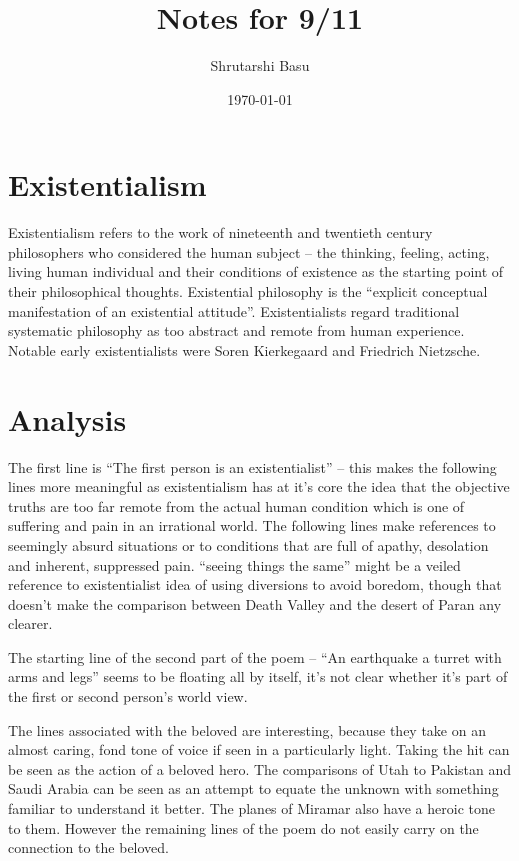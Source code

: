 \documentclass[11pt,letterpaper]{article}
\title{Notes for 9/11}
\author{Shrutarshi Basu}
\date{\today}
\begin{document}
\maketitle
\doublespacing


\section*{Existentialism}
Existentialism refers to the work of nineteenth and twentieth century philosophers who considered the human subject -- the thinking, feeling, acting, living human individual and their conditions of existence as the starting point of their philosophical thoughts. Existential philosophy is the ``explicit conceptual manifestation of an existential attitude''. Existentialists regard traditional systematic philosophy as too abstract and remote from human experience. Notable early existentialists were Soren Kierkegaard and Friedrich Nietzsche.

\section*{Analysis}
The first line is ``The first person is an existentialist'' -- this makes the following lines more meaningful as existentialism has at it's core the idea that the objective truths are too far remote from the actual human condition which is one of suffering and pain in an irrational world. The following lines make references to seemingly absurd situations or to conditions that are full of apathy, desolation and inherent, suppressed pain. ``seeing things the same'' might be a veiled reference to existentialist idea of using diversions to avoid boredom, though that doesn't make the comparison between Death Valley and the desert of Paran any clearer.

The starting line of the second part of the poem -- ``An earthquake a turret with arms and legs'' seems to be floating all by itself, it's not clear whether it's part of the first or second person's world view.

The lines associated with the beloved are interesting, because they take on an almost caring, fond tone of voice if seen in a particularly light. Taking the hit can be seen as the action of a beloved hero. The comparisons of Utah to Pakistan and Saudi Arabia can be seen as an attempt to equate the unknown with something familiar to understand it better. The planes of Miramar also have a heroic tone to them. However the remaining lines of the poem do not easily carry on the connection to the beloved.
\end{document}
